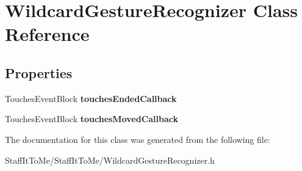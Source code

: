 \hypertarget{interface_wildcard_gesture_recognizer}{
\section{\-Wildcard\-Gesture\-Recognizer \-Class \-Reference}
\label{interface_wildcard_gesture_recognizer}
}
\subsection*{\-Properties}
\begin{DoxyCompactItemize}
\item 
\hypertarget{interface_wildcard_gesture_recognizer_a583e10f810d3778d7772ad9c58a0a14b}{
\-Touches\-Event\-Block {\bfseries touches\-Ended\-Callback}}
\label{interface_wildcard_gesture_recognizer_a583e10f810d3778d7772ad9c58a0a14b}

\item 
\hypertarget{interface_wildcard_gesture_recognizer_a2f92369ba28ee1fb4ff070dd341d049f}{
\-Touches\-Event\-Block {\bfseries touches\-Moved\-Callback}}
\label{interface_wildcard_gesture_recognizer_a2f92369ba28ee1fb4ff070dd341d049f}

\end{DoxyCompactItemize}


\-The documentation for this class was generated from the following file\-:\begin{DoxyCompactItemize}
\item 
\-Staff\-It\-To\-Me/\-Staff\-It\-To\-Me/\-Wildcard\-Gesture\-Recognizer.\-h\end{DoxyCompactItemize}
